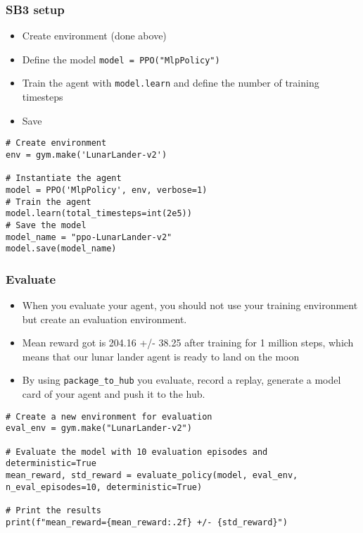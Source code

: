 \begin{frame}[fragile]\frametitle{SB3 setup}

\begin{itemize}
\item Create environment (done above)
\item Define the model \lstinline|model = PPO("MlpPolicy")|
\item Train the agent with \lstinline|model.learn| and define the number of training timesteps
\item Save
\end{itemize}


\begin{lstlisting}
# Create environment
env = gym.make('LunarLander-v2')

# Instantiate the agent
model = PPO('MlpPolicy', env, verbose=1)
# Train the agent
model.learn(total_timesteps=int(2e5))
# Save the model
model_name = "ppo-LunarLander-v2"
model.save(model_name)
\end{lstlisting}

\end{frame}

\begin{frame}[fragile]\frametitle{Evaluate}

\begin{itemize}
\item When you evaluate your agent, you should not use your training environment but create an evaluation environment.
\item Mean reward got is 204.16 +/- 38.25 after training for 1 million steps, which means that our lunar lander agent is ready to land on the moon 
\item By using \lstinline|package_to_hub| you evaluate, record a replay, generate a model card of your agent and push it to the hub.
\end{itemize}

\begin{lstlisting}
# Create a new environment for evaluation
eval_env = gym.make("LunarLander-v2")

# Evaluate the model with 10 evaluation episodes and deterministic=True
mean_reward, std_reward = evaluate_policy(model, eval_env, n_eval_episodes=10, deterministic=True)

# Print the results
print(f"mean_reward={mean_reward:.2f} +/- {std_reward}")
\end{lstlisting}


\end{frame}



